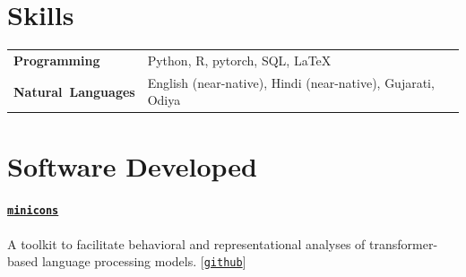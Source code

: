 \documentclass[11pt]{article}
\newcommand{\github}[1]{[\href{#1}{\texttt{github}}]}
\begin{document}
\renewcommand*{\arraystretch}{1}
\section*{Skills}
\vspace{-1em}
\begin{longtable}{p{}  p{} }
    \textbf{Programming} & Python, R, pytorch, SQL, \LaTeX\\
    \textbf{Natural~Languages} & English (near-native), Hindi (near-native), Gujarati, Odiya
    \end{longtable}
\section*{Software Developed}
\paragraph{\href{https://pypi.org/project/minicons/}{\texttt{minicons}}} A toolkit to facilitate behavioral and representational analyses of transformer-based language processing models. \github{https://github.com/kanishkamisra/minicons}


\end{document}
